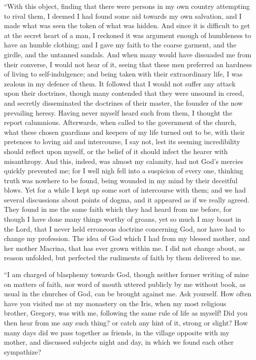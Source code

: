 ``With this object, finding that there were persons in my own
country attempting to rival them, I deemed I had found some aid
towards my own salvation, and I made what was seen the token of what
was hidden. And since it is difficult to get at the secret heart of a
man, I reckoned it was argument enough of humbleness to have an humble
clothing; and I gave my faith to the coarse garment, and the girdle,
and the untanned sandals. And when many would have dissuaded me from
their converse, I would not hear of it, seeing that these men
preferred an hardness of living to self-indulgence; and being taken
with their extraordinary life, I was zealous in my defence of them. It
followed that I would not suffer any attack upon their doctrines,
though many contended that they were unsound in creed, and secretly
disseminated the doctrines of their master, the founder of the now
prevailing heresy. Having never myself heard such from them, I thought
the report calumnious. Afterwards, when called to the government of
the church, what these chosen guardians and keepers of my life turned
out to be, with their pretences to loving aid and intercourse, I say
not, lest its seeming incredibility should reflect upon myself, or the
belief of it should infect the hearer with misanthropy. And this,
indeed, was almost my calamity, had not God's mercies quickly
prevented me; for I well nigh fell into a suspicion of every one,
thinking truth was nowhere to be found, being wounded in my mind by
their deceitful blows. Yet for a while I kept up some sort of
intercourse with them; and we had several discussions about points of
dogma, and it appeared as if we really agreed. They found in me the
same faith which they had heard from me before, for though I have done
many things worthy of groans, yet so much I may boast in the Lord,
that I never held erroneous doctrine concerning God, nor have had to
change my profession. The idea of God which I had from my blessed
mother, and her mother Macrina, that has ever grown within me. I did
not change about, as reason unfolded, but perfected the rudiments of
faith by them delivered to me.

``I am charged of blasphemy towards God, though neither former
writing of mine on matters of faith, nor word of mouth uttered
publicly by me without book, as usual in the churches of God, can
be brought against me. Ask yourself. How often
have you visited me at my monastery on the Iris, when my most
religious brother, Gregory, was with me, following the same rule of
life as myself! Did you then hear from me any such thing? or catch any
hint of it, strong or slight? How many days did we pass together as
friends, in the village opposite with my mother, and discussed
subjects night and day, in which we found each other sympathize?

